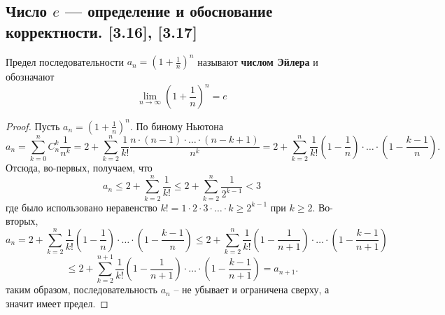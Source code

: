 \documentclass[12pt, a4paper]{article}
\begin{document}
    \subsection{Число $e$ --- определение и обоснование корректности. [3.16], [3.17]}
    Предел последовательности $a_n = \left(1 + \frac{1}{n}\right)^n$ называют \textbf{числом Эйлера} и обозначают
    \begin{equation*}
         \lim_{n \to \infty} \left(1 + \frac{1}{n}\right)^n = e
    \end{equation*}
    \begin{proof}
    Пусть $a_n = (1 + \frac{1}{n})^n$. По биному Ньютона
    \begin{equation*}
        a_n = \sum_{k=0}^{n} C^k_n \frac{1}{n^k} = 2 + \sum_{k=2}^{n} \frac{1}{k!} \frac{n \cdot (n - 1) \cdot \dots \cdot (n - k + 1)}{n^k} = 2 + \sum_{k=2}^{n} \frac{1}{k!} \left(1 - \frac{1}{n}\right) \cdot \dots \cdot \left(1 - \frac{k-1}{n}\right).
    \end{equation*}
    Отсюда, во-первых, получаем, что 
    \begin{equation*}
        a_n \leq 2 + \sum_{k=2}^{n} \frac{1}{k!} \leq 2 + \sum_{k=2}^{n} \frac{1}{2^{k-1}} < 3
    \end{equation*}
    где было использовано неравенство $k! = 1 \cdot 2 \cdot 3 \cdot \dots \cdot k \geq 2^{k-1}$ при $k \geq 2$. Во-вторых, 
    \begin{equation*}
        a_n = 2 + \sum_{k=2}^{n} \frac{1}{k!} \left(1 - \frac{1}{n}\right)\cdot \dots \cdot \left(1 - \frac{k - 1}{n}\right) \leq 2 + \sum_{k=2}^{n} \frac{1}{k!} \left(1 - \frac{1}{n + 1}\right)\cdot \dots \cdot \left(1 - \frac{k-1}{n + 1}\right)
    \end{equation*}
    \begin{equation*}
        \leq 2 + \sum_{k=2}^{n + 1} \frac{1}{k!}\left(1 - \frac{1}{n + 1}\right) \cdot \dots \cdot \left(1 - \frac{k-1}{n + 1}\right) = a_{n + 1}.
    \end{equation*}
    таким образом, последовательность $a_n$ -- не убывает и ограничена сверху, а значит имеет предел.
    \end{proof}
\end{document}
